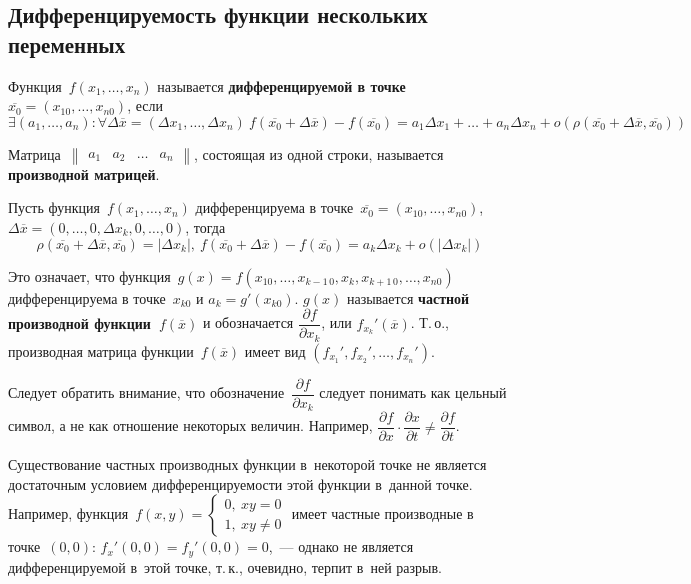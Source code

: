 \subsection{Дифференцируемость функции нескольких переменных}
 Функция~$f(x_1, \ldots, x_n)$ называется \textbf{дифференцируемой в точке~$\overline{x_0} = (x_{10}, \ldots, x_{n0})$}, если
\begin{equation*}
\exists (a_1, \ldots, a_n) \colon \forall \Delta \overline x = (\Delta x_1, \ldots, \Delta x_n) \
f(\overline{x_0} + \Delta \overline x) - f(\overline{x_0}) =
a_1 \Delta x_1 + \ldots + a_n \Delta x_n + o(\rho(\overline{x_0} + \Delta \overline x, \overline{x_0}))
\end{equation*}

 Матрица~$\begin{Vmatrix}
a_1 & a_2 & \ldots & a_n
\end{Vmatrix}$, состоящая из одной строки, называется \textbf{производной матрицей}.

Пусть функция~$f(x_1, \ldots, x_n)$ дифференцируема в точке~$\overline{x_0} = (x_{10}, \ldots, \allowbreak x_{n0})$, $\Delta \overline x = (0, \ldots, \allowbreak 0, \Delta x_k, \allowbreak 0, \ldots, \allowbreak 0)$, тогда
\begin{equation*}
\rho(\overline{x_0} + \Delta \overline x, \overline{x_0}) = |\Delta x_k|, \
f(\overline{x_0} + \Delta \overline x) - f(\overline{x_0}) =
a_k \Delta x_k + o(|\Delta x_k|)
\end{equation*}

Это означает, что функция~$g(x) = f(x_{10}, \ldots, x_{k-1\, 0}, x_k, x_{k+1\, 0}, \ldots, x_{n0})$ дифференцируема в точке~$x_{k0}$ и $a_k = g'(x_{k0})$.
 $g(x)$ называется \textbf{частной производной функции~$f(\overline x)$} и обозначается $\dfrac{\partial f}{\partial x_k}$, или $f_{x_k}'(\overline x)$.
Т.\,о., производная матрица функции~$f(\overline x)$ имеет вид $(f_{x_1}', f_{x_2}', \ldots, f_{x_n}')$.

Следует обратить внимание, что обозначение~$\dfrac{\partial f}{\partial x_k}$ следует понимать как цельный символ, а не как отношение некоторых величин.
Например, $\dfrac{\partial f}{\partial x} \cdot \dfrac{\partial x}{\partial t} \neq \dfrac{\partial f}{\partial t}$.

Существование частных производных функции в~некоторой точке не является достаточным условием дифференцируемости этой функции в~данной точке.
Например, функция~$f(x, y) =
\begin{cases}
0, \ xy = 0 \\
1, \ xy \neq 0
\end{cases}$
имеет частные производные в точке~$(0, 0)$: $f_x'(0, 0) = f_y'(0, 0) = 0$,~--- однако не является дифференцируемой в~этой точке, т.\,к., очевидно, терпит в~ней разрыв.

